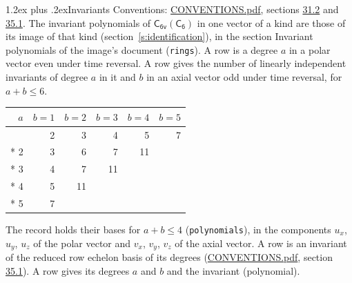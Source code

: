 \documentclass[10pt,a4paper]{article}
\makeatletter
\renewcommand\section{\@startsection{section}{1}{\z@}{-3ex plus -1ex minus -.2ex}%
  {1.2ex plus .2ex}{\normalfont\large\sffamily\bfseries\color{parttitle}}}
\numberwithin{equation}{section}
\newcommand{\grp}[1]{\mathsf{#1}}
\makeatother
\begin{document}
\section{Invariants}\label{s:invariants}
Conventions: \href{../../CONVENTIONS.pdf}{CONVENTIONS.pdf}, sections \href{../../CONVENTIONS.pdf\#conv.31.2}{31.2} and \href{../../CONVENTIONS.pdf\#conv.35.1}{35.1}.
The invariant polynomials of $\grp{C_{6v}}(\grp{C_{6}})$ in one vector of a kind are those of its image of that kind (section~\ref{s:identification}), in the section Invariant polynomials of the image's document (\texttt{rings}).
\leavevmode\label{n:index.degree.polar}\label{n:index.degree.axial}A row is a degree $a$ in a polar vector even under time reversal. A row gives the number of linearly independent invariants of degree $a$ in it and $b$ in an axial vector odd under time reversal, for $a + b \le 6$.
{\small\begin{longtable}{@{}rrrrrr@{}}\toprule
$a$ & $b = 1$ & $b = 2$ & $b = 3$ & $b = 4$ & $b = 5$\\\midrule\endhead
\bottomrule\endfoot\endlastfoot
1 & 2 & 3 & 4 & 5 & 7\\*
2 & 3 & 6 & 7 & 11 & \\*
3 & 4 & 7 & 11 &  & \\*
4 & 5 & 11 &  &  & \\*
5 & 7 &  &  &  & \\
\bottomrule\end{longtable}}
\leavevmode\label{n:local.component.polar}\label{n:local.component.axial}The record holds their bases for $a + b \le 4$ (\texttt{polynomials}), in the components $u_{x}$, $u_{y}$, $u_{z}$ of the polar vector and $v_{x}$, $v_{y}$, $v_{z}$ of the axial vector. \label{n:head.polynomial}A row is an invariant of the reduced row echelon basis of its degrees (\href{../../CONVENTIONS.pdf}{CONVENTIONS.pdf}, section \href{../../CONVENTIONS.pdf\#conv.35.1}{35.1}). A row gives its degrees $a$ and $b$ and the invariant (polynomial).
\end{document}
